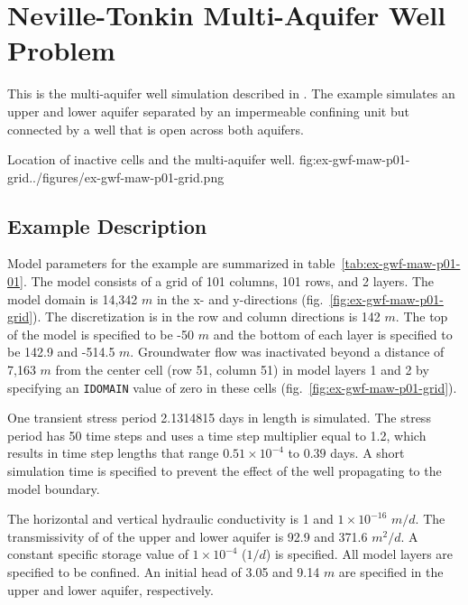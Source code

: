 \section{Neville-Tonkin Multi-Aquifer Well Problem}

This is the multi-aquifer well simulation described in \cite{nevilletonkin2004}. The example simulates an upper and lower aquifer separated by an impermeable confining unit but connected by a well that is open across both aquifers.                                

\begin{StandardFigure}{
                                     Location of inactive cells and the multi-aquifer well. 
                                     }{fig:ex-gwf-maw-p01-grid}{../figures/ex-gwf-maw-p01-grid.png}
\end{StandardFigure}   


\subsection{Example Description}
Model parameters for the example are summarized in table~\ref{tab:ex-gwf-maw-p01-01}.  The model consists of a grid of 101 columns, 101 rows, and 2 layers. The model domain is 14,342 $m$ in the x- and y-directions (fig.~\ref{fig:ex-gwf-maw-p01-grid}). The discretization is in the row and column directions is 142 $m$. The top of the model is specified to be -50 $m$ and the bottom of each layer is specified to be 142.9 and -514.5 $m$. Groundwater flow was inactivated beyond a distance of 7,163 $m$ from the center cell (row 51, column 51) in model layers 1 and 2 by specifying an \texttt{IDOMAIN} value of zero in these cells (fig.~\ref{fig:ex-gwf-maw-p01-grid}).

One transient stress period 2.1314815 days in length is simulated. The stress period has 50 time steps and uses a time step multiplier equal to 1.2, which results in time step lengths that range $0.51 \times 10^{-4}$ to $0.39$ days. A short simulation time is specified to prevent the effect of the well propagating to the model boundary.



The horizontal and vertical hydraulic conductivity is 1 and $1 \times 10^{-16}$ $m/d$. The transmissivity of of the upper and lower aquifer is 92.9 and 371.6 $m^2/d$. A constant specific storage value of $1 \times 10^{-4}$ ($1/d$) is specified. All model layers are specified to be confined. An initial head of 3.05 and 9.14 $m$ are specified in the upper and lower aquifer, respectively. 

